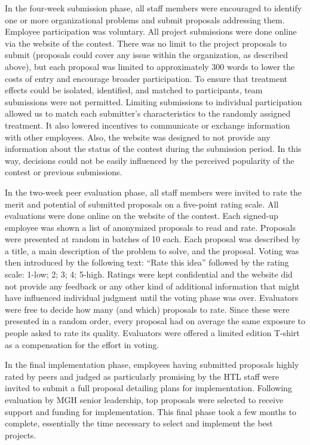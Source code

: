 \documentclass[11pt, titlepage]{article}
\begin{document}
In the four-week submission phase, all staff members were encouraged to
identify one or more organizational problems and submit proposals
addressing them. Employee participation was voluntary. All project
submissions were done online via the website of the contest. There was
no limit to the project proposals to submit (proposals could cover any
issue within the organization, as described above), but each proposal
was limited to approximately 300 words to lower the costs of entry and
encourage broader participation. To ensure that treatment effects could
be isolated, identified, and matched to participants, team submissions
were not permitted. Limiting submissions to individual participation
allowed us to match each submitter's characteristics to the randomly
assigned treatment. It also lowered incentives to communicate or
exchange information with other employees. Also, the website was
designed to not provide any information about the status of the contest
during the submission period. In this way, decisions could not be easily
influenced by the perceived popularity of the contest or previous
submissions.

In the two-week peer evaluation phase, all staff members were invited to
rate the merit and potential of submitted proposals on a five-point
rating scale. All evaluations were done online on the website of the
contest. Each signed-up employee was shown a list of anonymized
proposals to read and rate. Proposals were presented at random in
batches of 10 each. Each proposal was described by a title, a main
description of the problem to solve, and the proposal. Voting was then
introduced by the following text: ``Rate this idea'' followed by the
rating scale: 1-low; 2; 3; 4; 5-high. Ratings were kept confidential and
the website did not provide any feedback or any other kind of additional
information that might have influenced individual judgment until the
voting phase was over. Evaluators were free to decide how many (and
which) proposals to rate. Since these were presented in a random order,
every proposal had on average the same exposure to people asked to rate
its quality. Evaluators were offered a limited edition T-shirt as a
compensation for the effort in voting.

In the final implementation phase, employees having submitted proposals
highly rated by peers and judged as particularly promising by the HTL
staff were invited to submit a full proposal detailing plans for
implementation. Following evaluation by MGH senior leadership, top
proposals were selected to receive support and funding for
implementation. This final phase took a few months to complete,
essentially the time necessary to select and implement the best
projects.
\end{document}
